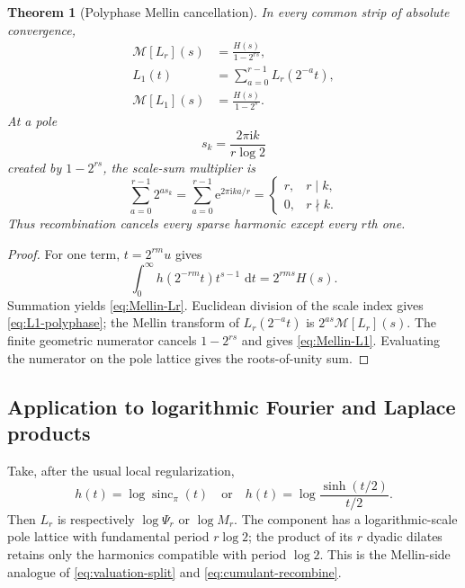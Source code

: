 \documentclass[11pt,oneside]{article}
\numberwithin{equation}{section}
\newtheorem{theorem}{Theorem}[section]
\theoremstyle{definition}
\theoremstyle{remark}
\newcommand{\sincpi}{\operatorname{sinc}_{\pi}}
\newcommand{\dd}{\,\mathrm d}
\newcommand{\e}{\mathrm e}
\newcommand{\ii}{\mathrm i}
\newcommand{\cM}{\mathcal M}
\begin{document}
\begin{theorem}[Polyphase Mellin cancellation]
\label{thm:Mellin-cancellation}
In every common strip of absolute convergence,
\begin{align}
 \cM[L_r](s)&=\frac{H(s)}{1-2^{rs}},                        \label{eq:Mellin-Lr}\\
 L_1(t)&=\sum_{a=0}^{r-1}L_r(2^{-a}t),                      \label{eq:L1-polyphase}\\
 \cM[L_1](s)&=\frac{H(s)}{1-2^s}.                          \label{eq:Mellin-L1}
\end{align}
At a pole
\begin{equation}
 s_k=\frac{2\pi\ii k}{r\log2}                              \label{eq:sparse-pole-lattice}
\end{equation}
created by $1-2^{rs}$, the scale-sum multiplier is
\begin{equation}
 \sum_{a=0}^{r-1}2^{as_k}
 =\sum_{a=0}^{r-1}\e^{2\pi\ii ka/r}
 =\begin{cases}r,&r\mid k,\\0,&r\nmid k.
 \end{cases}                                               \label{eq:roots-unity-cancel}
\end{equation}
Thus recombination cancels every sparse harmonic except every $r$th one.
\end{theorem}

\begin{proof}
For one term, $t=2^{rm}u$ gives
\[
 \int_0^{\infty}h(2^{-rm}t)t^{s-1}\,\dd t=2^{rms}H(s).
\]
Summation yields \eqref{eq:Mellin-Lr}.  Euclidean division of the scale index
gives \eqref{eq:L1-polyphase}; the Mellin transform of $L_r(2^{-a}t)$ is
$2^{as}\cM[L_r](s)$.  The finite geometric numerator cancels
$1-2^{rs}$ and gives \eqref{eq:Mellin-L1}.  Evaluating the numerator on the
pole lattice gives the roots-of-unity sum.
\end{proof}

\subsection{Application to logarithmic Fourier and Laplace products}

Take, after the usual local regularization,
\begin{equation}
 h(t)=\log\sincpi(t)
 \quad\text{or}\quad
 h(t)=\log\frac{\sinh(t/2)}{t/2}.                           \label{eq:Mellin-kernels}
\end{equation}
Then $L_r$ is respectively $\log\Psi_r$ or $\log M_r$.  The component has a
logarithmic-scale pole lattice with fundamental period $r\log2$; the product of
its $r$ dyadic dilates retains only the harmonics compatible with period
$\log2$.  This is the Mellin-side analogue of
\eqref{eq:valuation-split} and \eqref{eq:cumulant-recombine}.
\end{document}
